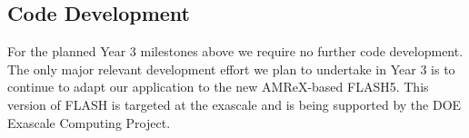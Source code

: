 \documentclass[12pt]{article}
\begin{document}
\subsection{Code Development}

For the planned Year 3 milestones above we require no further code development. 
The only major relevant development effort we plan to undertake in Year 3 is to continue to adapt our \sparkmone application to the new AMReX-based FLASH5.
This version of FLASH is targeted at the exascale and is being supported by the DOE Exascale Computing Project.

\renewcommand\bibsection{\section*{References}}
\setlength{\bibsep}{2pt}

\end{document}
